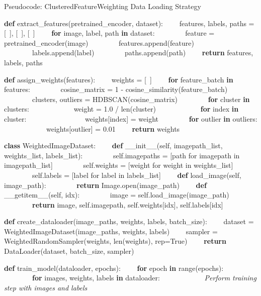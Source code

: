 \begin{algorithm}
\caption{Pseudocode: ClusteredFeatureWeighting Data Loading Strategy}
\label{algorithm:Clusteredfeatureweighting}
\begin{algorithmic}[1]
\State \textbf{def} extract\_features(pretrained\_encoder, dataset):
\State \ \ \ \ features, labels, paths = [~], [~], [~]
\State \ \ \ \ \textbf{for} image, label, path \textbf{in} dataset:
\State \ \ \ \ \ \ \ \ feature = pretrained\_encoder(image)
\State \ \ \ \ \ \ \ \ features.append(feature)
\State \ \ \ \ \ \ \ \ labels.append(label)
\State \ \ \ \ \ \ \ \ paths.append(path)
\State \ \ \ \ \textbf{return} features, labels, paths

\State \textbf{def} assign\_weights(features):
\State \ \ \ \ weights = [~]
\State \ \ \ \ \textbf{for} feature\_batch \textbf{in} features:
\State \ \ \ \ \ \ \ \ cosine\_matrix = 1 - cosine\_similarity(feature\_batch)
\State \ \ \ \ \ \ \ \ clusters, outliers = HDBSCAN(cosine\_matrix)
\State \ \ \ \ \ \ \ \ \textbf{for} cluster \textbf{in} clusters:
\State \ \ \ \ \ \ \ \ \ \ \ \ weight = 1.0 / len(cluster)
\State \ \ \ \ \ \ \ \ \ \ \ \ \textbf{for} index \textbf{in} cluster:
\State \ \ \ \ \ \ \ \ \ \ \ \ \ \ \ \ weights[index] = weight
\State \ \ \ \ \ \ \ \ \textbf{for} outlier \textbf{in} outliers:
\State \ \ \ \ \ \ \ \ \ \ \ \ weights[outlier] = 0.01
\State \ \ \ \ \textbf{return} weights

\State \textbf{class} WeightedImageDataset:
\State \ \ \ \ \textbf{def} \_\_init\_\_(self, imagepath\_list, weights\_list, labels\_list):
\State \ \ \ \ \ \ \ \ self.imagepaths = [path for imagepath in imagepath\_list]
\State \ \ \ \ \ \ \ \ self.weights = [weight for weight in weights\_list]
\State \ \ \ \ \ \ \ \ self.labels = [label for label in labels\_list]
\State \ \ \ \ \textbf{def} load\_image(self, image\_path):
\State \ \ \ \ \ \ \ \ \textbf{return} Image.open(image\_path)
\State \ \ \ \ \textbf{def} \_\_getitem\_\_(self, idx):
\State \ \ \ \ \ \ \ \ image = self.load\_image(image\_path)
\State \ \ \ \ \ \ \ \ \textbf{return} image, self.imagepath, self.weights[idx], self.labels[idx]

\State \textbf{def} create\_dataloader(image\_paths, weights, labels, batch\_size):
\State \ \ \ \ dataset = WeightedImageDataset(image\_paths, weights, labels)
\State \ \ \ \ sampler = WeightedRandomSampler(weights, len(weights), rep=True)
\State \ \ \ \ \textbf{return} DataLoader(dataset, batch\_size, sampler)

\State \textbf{def} train\_model(dataloader, epochs):
\State \ \ \ \ \textbf{for} epoch \textbf{in} range(epochs):
\State \ \ \ \ \ \ \ \ \textbf{for} images, weights, labels \textbf{in} dataloader:
\State \ \ \ \ \ \ \ \ \ \ \ \ \textit{Perform training step with images and labels}


\end{algorithmic}
\end{algorithm}
